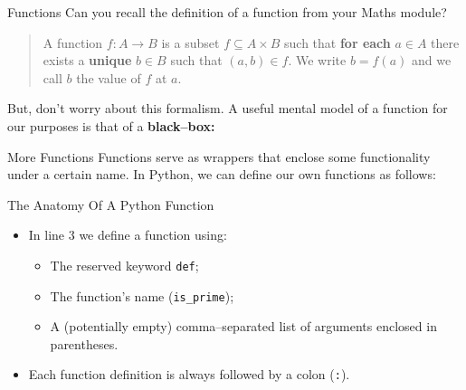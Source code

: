 \documentclass[aspectratio=169, 12pt, xcolor=table]{beamer}
\begin{document}
	\begin{frame}{Functions}
		Can you recall the definition of a function from your Maths module?\pause
		
		\begin{quote}
			A function $f:A\to B$ is a subset $f\subseteq A\times B$ such that \textbf{for each} $a\in A$ there exists a \textbf{unique} $b\in B$ such that $(a,b)\in f$. We write $b=f(a)$ and we call $b$ the value of $f$ at $a$.
		\end{quote}
	
		But, don't worry about this formalism. A useful mental model of a function for our purposes is that of a \textbf{black--box:}
		
		\begin{center}
		\end{center}
	\end{frame}

	\begin{frame}{More Functions}
		Functions serve as wrappers that enclose some functionality under a certain name. In Python, we can define our own functions as follows:
		
	\end{frame}

	\begin{frame}{The Anatomy Of A Python Function}
		\begin{minipage}[t]{0.5\textwidth}
			\vspace{0pt}
			\begin{itemize}
				\item In line 3 we define a function using:
				\begin{itemize}
					\item The reserved keyword \texttt{def};
					\item The function's name (\texttt{is\_prime});
					\item A (potentially empty) comma--separated list of arguments enclosed in parentheses.
				\end{itemize}
				\item Each function definition is always followed by a colon (\texttt{:}).
			\end{itemize}
		\end{minipage}\hfill
		\begin{minipage}[t]{0.45\textwidth}
			\vspace{0pt}
			
		\end{minipage}
	\end{frame}
\end{document}
